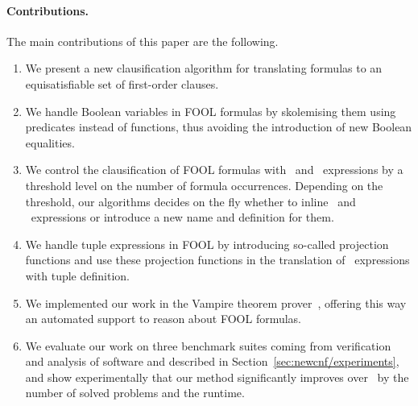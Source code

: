 
\paragraph{Contributions.} The main contributions of this paper are the following.
\begin{enumerate}
  \item We present a new clausification algorithm for translating \folb{} formulas to an equisatisfiable set of first-order clauses. 
  \item We handle Boolean variables in FOOL formulas by skolemising them using \Skolem{} predicates instead of \Skolem{} functions, thus avoiding the introduction of new Boolean equalities. 
  \item We control the clausification of FOOL formulas with \ITE\ and \LETIN\ expressions by a threshold level on the number of formula occurrences. Depending on the threshold, our algorithms decides on the fly whether to inline \ITE\ and \LETIN\ expressions or introduce a new name and definition for them. 
\item We handle tuple expressions in FOOL by introducing so-called projection functions  and use these projection functions in the translation of \LETIN\ expressions with tuple definition. 
  \item We implemented our work in the Vampire theorem prover~\cite{Vampire13}, 
  offering this way an automated support to reason about FOOL formulas. 
  \item We evaluate our work on three benchmark suites coming from verification
    and analysis of software and described in
    Section~\ref{sec:newcnf/experiments}, and show experimentally that our method
    significantly improves over~\cite{VampireAndFOOL} by the number of solved problems and the runtime.
\end{enumerate}
